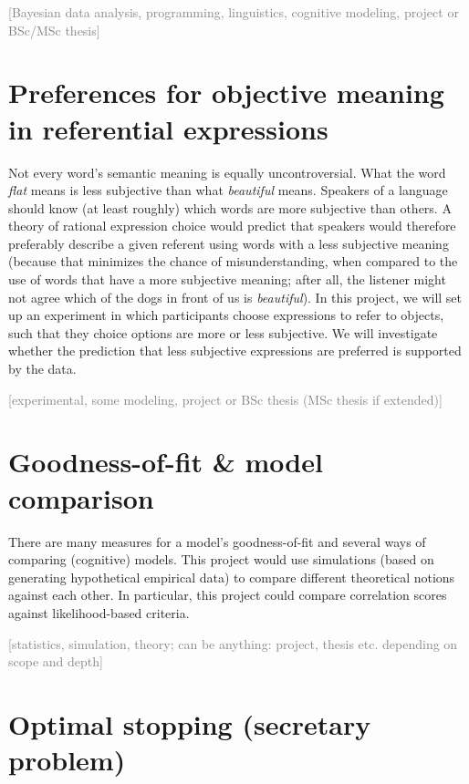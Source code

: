 \documentclass[fleqn,reqno,10pt]{article}
\newcommand{\scope}[1]{\hfill\textcolor{gray}{[#1]}}
\begin{document}
\scope{Bayesian data analysis, programming, linguistics, cognitive modeling, project or BSc/MSc thesis}

\section{Preferences for objective  meaning in referential expressions}

Not every word's semantic meaning is equally uncontroversial. What the word \emph{flat} means is less subjective than what \emph{beautiful} means. Speakers of a language should know (at least roughly) which words are more subjective than others. A theory of rational expression choice would predict that speakers would therefore preferably describe a given referent using words with a less subjective meaning (because that minimizes the chance of misunderstanding, when compared to the use of words that have a more subjective meaning; after all, the listener might not agree which of the dogs in front of us is \emph{beautiful}). In this project, we will set up an experiment in which participants choose expressions to refer to objects, such that they choice options are more or less subjective. We will investigate whether the prediction that less subjective expressions are preferred is supported by the data.

\scope{experimental, some modeling, project or BSc thesis (MSc thesis if extended)}

\section{Goodness-of-fit \& model comparison}

There are many measures for a model's goodness-of-fit and several ways of comparing (cognitive)
models. This project would use simulations (based on generating hypothetical empirical data) to
compare different theoretical notions against each other. In particular, this project could
compare correlation scores against likelihood-based criteria.

\scope{statistics, simulation, theory; can be anything: project, thesis etc. depending on scope
and depth}

\section{Optimal stopping (secretary problem)}
\end{document}
